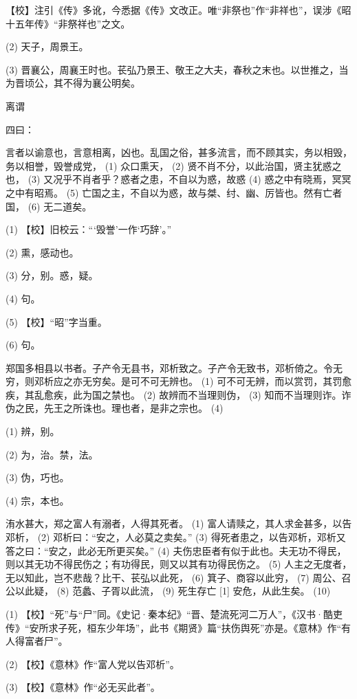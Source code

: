 \documentclass[12pt,UTF8]{ctexbook}
\begin{document}
【校】注引《传》多讹，今悉据《传》文改正。唯“非祭也”作“非祥也”，误涉《昭十五年传》“非祭祥也”之文。

(2) 天子，周景王。

(3) 晋襄公，周襄王时也。苌弘乃景王、敬王之大夫，春秋之末也。以世推之，当为晋顷公，其不得为襄公明矣。





离谓


四曰：

言者以谕意也，言意相离，凶也。乱国之俗，甚多流言，而不顾其实，务以相毁，务以相誉，毁誉成党， (1) 众口熏天， (2) 贤不肖不分，以此治国，贤主犹惑之也， (3) 又况乎不肖者乎？惑者之患，不自以为惑，故惑 (4) 惑之中有晓焉，冥冥之中有昭焉。 (5) 亡国之主，不自以为惑，故与桀、纣、幽、厉皆也。然有亡者国， (6) 无二道矣。

(1) 【校】旧校云：“‘毁誉’一作‘巧辞’。”

(2) 熏，感动也。

(3) 分，别。惑，疑。

(4) 句。

(5) 【校】“昭”字当重。

(6) 句。

郑国多相县以书者。子产令无县书，邓析致之。子产令无致书，邓析倚之。令无穷，则邓析应之亦无穷矣。是可不可无辨也。 (1) 可不可无辨，而以赏罚，其罚愈疾，其乱愈疾，此为国之禁也。 (2) 故辨而不当理则伪， (3) 知而不当理则诈。诈伪之民，先王之所诛也。理也者，是非之宗也。 (4)

(1) 辨，别。

(2) 为，治。禁，法。

(3) 伪，巧也。

(4) 宗，本也。

洧水甚大，郑之富人有溺者，人得其死者。 (1) 富人请赎之，其人求金甚多，以告邓析， (2) 邓析曰：“安之，人必莫之卖矣。” (3) 得死者患之，以告邓析，邓析又答之曰：“安之，此必无所更买矣。” (4) 夫伤忠臣者有似于此也。夫无功不得民，则以其无功不得民伤之；有功得民，则又以其有功得民伤之。 (5) 人主之无度者，无以知此，岂不悲哉？比干、苌弘以此死， (6) 箕子、商容以此穷， (7) 周公、召公以此疑， (8) 范蠡、子胥以此流， (9) 死生存亡 [1] 安危，从此生矣。 (10)

(1) 【校】“死”与“尸”同。《史记·秦本纪》“晋、楚流死河二万人”，《汉书·酷吏传》“安所求子死，桓东少年场”，此书《期贤》篇“扶伤舆死”亦是。《意林》作“有人得富者尸”。

(2) 【校】《意林》作“富人党以告邓析”。

(3) 【校】《意林》作“必无买此者”。
\end{document}

